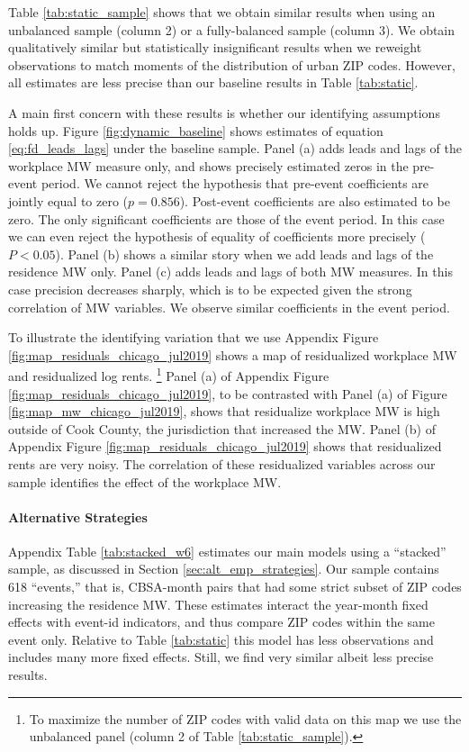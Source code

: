 Table \ref{tab:static_sample} shows that we obtain similar results when
using an unbalanced sample (column 2) or a fully-balanced sample (column 3).
We obtain qualitatively similar but statistically insignificant results when
we reweight observations to match moments of the distribution of urban ZIP 
codes.
However, all estimates are less precise than our baseline results in Table 
\ref{tab:static}.

A main first concern with these results is whether our identifying assumptions 
holds up.
Figure \ref{fig:dynamic_baseline} shows estimates of equation 
\eqref{eq:fd_leads_lags} under the baseline sample.
Panel (a) adds leads and lags of the workplace MW measure only, and shows
precisely estimated zeros in the pre-event period.
We cannot reject the hypothesis that pre-event coefficients are jointly equal
to zero ($p = 0.856$).
Post-event coefficients are also estimated to be zero.
The only significant coefficients are those of the event period.
In this case we can even reject the hypothesis of equality of coefficients more
precisely ($P<0.05$).
Panel (b) shows a similar story when we add leads and lags of the residence MW
only.
Panel (c) adds leads and lags of both MW measures.
In this case precision decreases sharply, which is to be expected given the
strong correlation of MW variables.
We observe similar coefficients in the event period.

To illustrate the identifying variation that we use 
Appendix Figure \ref{fig:map_residuals_chicago_jul2019} shows a map of 
residualized workplace MW and residualized log rents.%
\footnote{To maximize the number of ZIP codes with valid data on this map we
use the unbalanced panel (column 2 of Table \ref{tab:static_sample}).}
Panel (a) of Appendix Figure \ref{fig:map_residuals_chicago_jul2019}, to be 
contrasted with Panel (a) of Figure \ref{fig:map_mw_chicago_jul2019}, 
shows that residualize workplace MW is high outside of Cook County, the 
jurisdiction that increased the MW.
Panel (b) of Appendix Figure \ref{fig:map_residuals_chicago_jul2019} shows that 
residualized rents are very noisy.
The correlation of these residualized variables across our sample identifies
the effect of the workplace MW.

\paragraph{Alternative Strategies}

Appendix Table \ref{tab:stacked_w6} estimates our main models using a ``stacked''
sample, as discussed in Section \ref{sec:alt_emp_strategies}.
Our sample contains 618 ``events,'' that is, CBSA-month pairs that had some 
strict subset of ZIP codes increasing the residence MW.
These estimates interact the year-month fixed effects with event-id indicators, 
and thus compare ZIP codes within the same event only.
Relative to Table \ref{tab:static} this model has less observations and includes 
many more fixed effects.
Still, we find very similar albeit less precise results.

